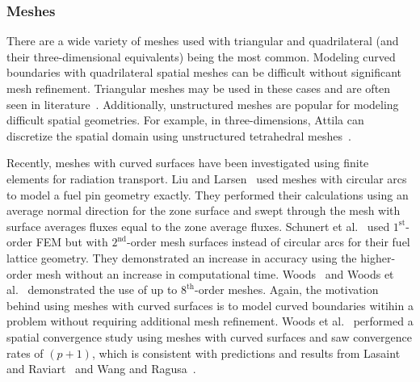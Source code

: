 \documentclass{article}
\begin{document}


\subsubsection{Meshes}
There are a wide variety of meshes used with triangular and quadrilateral (and their three-dimensional equivalents) being the most common. Modeling curved boundaries with quadrilateral spatial meshes can be difficult without significant mesh refinement. Triangular meshes may be used in these cases and are often seen in literature~\cite{ReedTriangularMesh,WangHODGTransport,WangDGFEMConvergence, MorelLLDrz}. Additionally, unstructured meshes are popular for modeling difficult spatial geometries. For example, in three-dimensions, Attila can discretize the spatial domain using unstructured tetrahedral meshes~\cite{WareingAttila}.

Recently, meshes with curved surfaces have been investigated using finite elements for radiation transport. Liu and Larsen~\cite{Liu2015SNCurvedMesh} used meshes with circular arcs to model a fuel pin geometry exactly. They performed their calculations using an average normal direction for the zone surface and swept through the mesh with surface averages fluxes equal to the zone average fluxes. Schunert et al.~\cite{Schunert2017HOMeshes} used $1^\text{st}$-order FEM but with $2^\text{nd}$-order mesh surfaces instead of circular arcs for their fuel lattice geometry. They demonstrated an increase in accuracy using the higher-order mesh without an increase in computational time. Woods~\cite{WoodsThesis} and Woods et al.~\cite{WoodsHoDgfemXyCurved} demonstrated the use of up to $8^\text{th}$-order meshes. Again, the motivation behind using meshes with curved surfaces is to model curved boundaries witihin a problem without requiring additional mesh refinement. Woods et al.~\cite{WoodsHoDgfemXyCurved} performed a spatial convergence study using meshes with curved surfaces and saw convergence rates of $(p+1)$, which is consistent with predictions and results from Lasaint and Raviart~\cite{LasaintFEM} and Wang and Ragusa~\cite{WangHODGTransport}.
\end{document}
